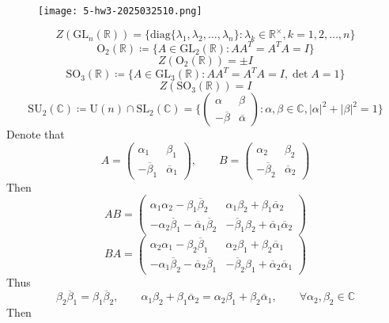 \begin{exercise}
\begin{figure}[H]
\centering
\texttt{[image: 5-hw3-2025032510.png]}
\label{}
\end{figure}
\end{exercise}
\[
Z(\mathrm{GL}_n(\mathbb{R}))=\{ \mathrm{diag}\{ \lambda_1,\lambda_2,\dots,\lambda _n \}:\lambda _k\in \mathbb{R}^{\times},k=1,2,\dots,n \}
\]
\[
\mathrm{O}_{2}(\mathbb{R})\coloneqq \{ A\in \mathrm{GL}_2(\mathbb{R}) :AA^{T}=A^{T}A=I\}
\]
\[
Z(\mathrm{O}_{2}(\mathbb{R}))=\pm I
\]
\[
\mathrm{SO}_{3}(\mathbb{R})\coloneqq \{ A\in \mathrm{GL}_{3}(\mathbb{R}):AA^{T}=A^{T}A=I,\det A=1 \}
\]
\[
Z(\mathrm{SO}_{3}(\mathbb{R}))=I
\]
\[
\mathrm{SU}_{2}(\mathbb{C})\coloneqq \mathrm{U}(n)\cap \mathrm{SL}_2(\mathbb{C})=\{ \begin{pmatrix}
\alpha & \beta \\
-\overline{\beta} & \overline{\alpha} 
\end{pmatrix}:\alpha,\beta\in \mathbb{C},\lvert \alpha \rvert ^2+\lvert \beta \rvert ^2=1 \}
\]
Denote that
\[
A=\begin{pmatrix}
\alpha_1 & \beta_1 \\
-\overline{\beta}_{1} & \overline{\alpha}_{1}
\end{pmatrix},\qquad B=\begin{pmatrix}
\alpha_2 & \beta_2 \\
-\overline{\beta}_{2} & \overline{\alpha}_{2}
\end{pmatrix}
\]
Then
\[
AB=\begin{pmatrix}
\alpha_1\alpha_2-\beta_1\overline{\beta}_{2} & \alpha_1\beta_2+\beta_1\overline{\alpha}_{2} \\
-\alpha_2\overline{\beta}_{1}-\overline{\alpha}_{1}\overline{\beta}_{2} & -\overline{\beta}_{1}\beta_2+\overline{\alpha}_{1}\overline{\alpha}_{2}
\end{pmatrix}
\]
\[
BA=\begin{pmatrix}
\alpha_2\alpha_1-\beta_2\overline{\beta}_{1} & \alpha_2\beta_1+\beta_2\overline{\alpha}_{1} \\
-\alpha_1\overline{\beta}_{2}-\overline{\alpha}_{2}\overline{\beta}_{1} & -\overline{\beta}_{2}\beta_1+\overline{\alpha}_{2}\overline{\alpha}_{1}
\end{pmatrix}
\]
Thus
\[
\beta_2\overline{\beta}_{1}=\beta_1\overline{\beta}_{2},\qquad \alpha_1\beta_2+\beta_1\overline{\alpha}_{2}=\alpha_2\beta_1+\beta_2\overline{\alpha}_{1},\qquad \forall \alpha_2,\beta_2\in \mathbb{C}
\]
Then
